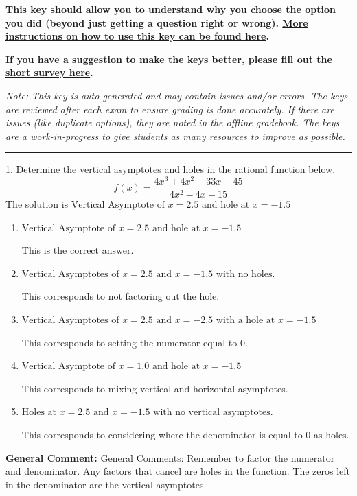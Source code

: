 \documentclass{extbook}[14pt]
\begin{document}
\textbf{This key should allow you to understand why you choose the option you did (beyond just getting a question right or wrong). \href{https://xronos.clas.ufl.edu/mac1105spring2020/courseDescriptionAndMisc/Exams/LearningFromResults}{More instructions on how to use this key can be found here}.}

\textbf{If you have a suggestion to make the keys better, \href{https://forms.gle/CZkbZmPbC9XALEE88}{please fill out the short survey here}.}

\textit{Note: This key is auto-generated and may contain issues and/or errors. The keys are reviewed after each exam to ensure grading is done accurately. If there are issues (like duplicate options), they are noted in the offline gradebook. The keys are a work-in-progress to give students as many resources to improve as possible.}

\rule{\textwidth}{0.4pt}

1. Determine the vertical asymptotes and holes in the rational function below.
\[ f(x) = \frac{4x^{3} +4 x^{2} -33 x -45}{4x^{2} -4 x -15} \] 
The solution is $ \text{Vertical Asymptote of } x = 2.5 \text{ and hole at } x = -1.5 $ 

\begin{enumerate}[label=\Alph*.] 
\item $ \text{Vertical Asymptote of } x = 2.5 \text{ and hole at } x = -1.5 $ 

 This is the correct answer. 
\item $ \text{Vertical Asymptotes of } x = 2.5 \text{ and } x = -1.5 \text{ with no holes.} $ 

 This corresponds to not factoring out the hole. 
\item $ \text{Vertical Asymptotes of } x = 2.5 \text{ and } x = -2.5 \text{ with a hole at } x = -1.5 $ 

 This corresponds to setting the numerator equal to 0. 
\item $ \text{Vertical Asymptote of } x = 1.0 \text{ and hole at } x = -1.5 $ 

 This corresponds to mixing vertical and horizontal asymptotes. 
\item $ \text{Holes at } x = 2.5 \text{ and } x = -1.5 \text{ with no vertical asymptotes.} $ 

 This corresponds to considering where the denominator is equal to 0 as holes. 
\end{enumerate} 
 
\textbf{General Comment:} General Comments: Remember to factor the numerator and denominator. Any factors that cancel are holes in the function. The zeros left in the denominator are the vertical asymptotes. 
\end{document}
